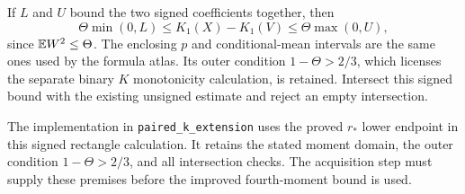 If $L$ and $U$ bound the two signed coefficients together, then
\[
 \Theta\min(0,L)\le K_1(X)-K_1(V)\le\Theta\max(0,U),
\]
since $\mathbb E W^2\le\Theta$. The enclosing $p$ and conditional-mean intervals
are the same ones used by the formula atlas. Its outer condition
$1-\Theta>2/3$, which licenses the separate binary $K$ monotonicity
calculation, is retained. Intersect this signed bound with the existing
unsigned estimate and reject an empty intersection.

The implementation in \texttt{paired\_k\_extension} uses the proved
$r_*$ lower endpoint in this signed rectangle calculation. It retains
the stated moment domain, the outer condition $1-\Theta>2/3$, and
all intersection checks. The acquisition step must supply these premises
before the improved fourth-moment bound is used.

